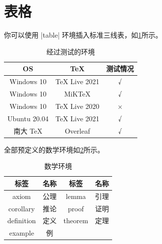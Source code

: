 
\section{表格}

你可以使用 |table| 环境插入标准三线表，如\cref{tab:testtab}所示。

\begin{table}[htbp]
    \caption{经过测试的环境}
    \label{tab:testtab}
    \begin{tabular}{ccc}
        \toprule
        OS           & TeX           & 测试情况 \\
        \midrule
        Windows 10   & TeX Live 2021 & √        \\
        Windows 10   & MiKTeX        & √        \\
        Windows 10   & TeX Live 2020 & ×        \\
        Ubuntu 20.04 & TeX Live 2021 & √        \\
        南大 TeX     & Overleaf      & √        \\
        \bottomrule
    \end{tabular}
\end{table}

全部预定义的数学环境如\cref{tab:mathenv}所示。

\begin{table}[htbp]
    \caption{数学环境}
    \label{tab:mathenv}
    \begin{tabular}{cc|cc}
        \toprule
        标签       & 名称 & 标签       & 名称 \\
        \midrule
        axiom      & 公理 & lemma      & 引理 \\
        corollary  & 推论 & proof      & 证明 \\
        definition & 定义 & theorem    & 定理 \\
        example    & 例   &            &      \\
        \bottomrule
    \end{tabular}
\end{table}
